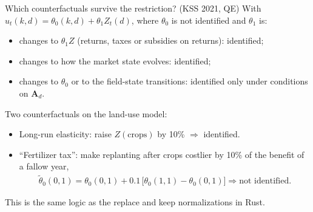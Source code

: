 \documentclass[aspectratio=169,11pt]{beamer}
\begin{document}
\begin{frame}{Which counterfactuals survive the restriction? (KSS 2021, QE)}
\small
With $u_t(k,d) = \theta_0(k,d) + \theta_1 Z_t(d)$, where $\theta_0$ is not identified and $\theta_1$ is:
\begin{itemize}
\item changes to $\theta_1 Z$ (returns, taxes or subsidies on returns): \alert{identified};
\item changes to how the market state evolves: \alert{identified};
\item changes to $\theta_0$ or to the field-state transitions: identified only under conditions on $\symbf A_d$.
\end{itemize}
Two counterfactuals on the land-use model:
\begin{itemize}
\item \alert{Long-run elasticity}: raise $Z(\text{crops})$ by 10\% $\Rightarrow$ identified.
\item \alert{``Fertilizer tax''}: make replanting after crops costlier by 10\% of the benefit of a fallow year,
\begin{align*}
\tilde\theta_0(0,1) = \theta_0(0,1) + 0.1\,\big[\theta_0(1,1) - \theta_0(0,1)\big] \Rightarrow \text{not identified.}
\end{align*}
\end{itemize}
This is the same logic as the replace and keep normalizations in Rust.
\end{frame}
\end{document}
